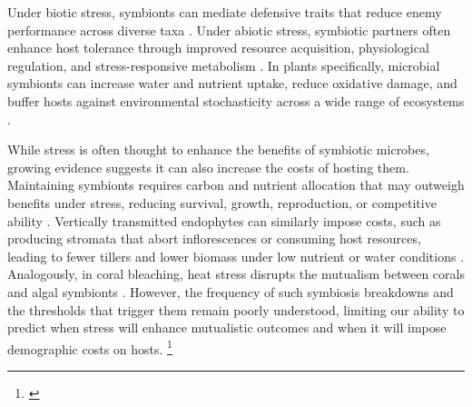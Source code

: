 \documentclass[12pt]{article}\usepackage[]{graphicx}\usepackage[dvipsnames]{xcolor}
\newcommand{\jacob}[2]{{\color{blue}{#1}}\footnote{\textit{\color{blue}{#2}}}}
\begin{document}
Under biotic stress, symbionts can mediate defensive traits that reduce enemy performance across diverse taxa \citep{atala2022fungal,bastias2017epichloe,vega2008insect,haine2008symbiont,florez2015defensive}.
Under abiotic stress, symbiotic partners often enhance host tolerance through improved resource acquisition, physiological regulation, and stress-responsive metabolism \citep{clay2002evolutionary, afkhami2008symbiosis,cesar2024defensive}.
In plants specifically, microbial symbionts can increase water and nutrient uptake, reduce oxidative damage, and buffer hosts against environmental stochasticity across a wide range of ecosystems \citep{amijee1989development,ruiz1996superoxide,fowler2023geographic,rudgers2020climate,li2026climate}.

While stress is often thought to enhance the benefits of symbiotic microbes, growing evidence suggests it can also increase the costs of hosting them.
Maintaining symbionts requires carbon and nutrient allocation that may outweigh benefits under stress, reducing survival, growth, reproduction, or competitive ability \citep{johnson1997functioning, bronstein2001exploitation, klironomos2003variation,thirkell2020carbon}.
Vertically transmitted endophytes can similarly impose costs, such as producing stromata that abort inflorescences or consuming host resources, leading to fewer tillers and lower biomass under low nutrient or water conditions \citep{saikkonen2004evolution, ahlholm2002vertically}.
Analogously, in coral bleaching, heat stress disrupts the mutualism between corals and algal symbionts \citep{vidal2009coral, marangon2025destabilization}.
However, the frequency of such symbiosis breakdowns and the thresholds that trigger them remain poorly understood, limiting our ability to predict when stress will enhance mutualistic outcomes and when it will impose demographic costs on hosts.
\jacob{}{I considered adding a sentence here on soil microbial communities to motivate the greenhouse experiment, but decided against it. Since the soil origin result is a null finding, extensive theoretical motivation in the intro feels disproportionate to its role in the paper, and it would disrupt the flow of this paragraph. I introduce the rationale briefly in the Methods instead. Please let me know if you disagree.}
\end{document}
